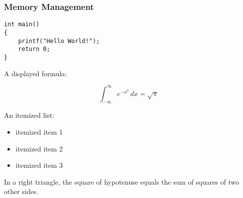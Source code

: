 \documentclass{beamer}
\begin{document}
\begin{frame}[fragile]
\frametitle{Memory Management}


\begin{lstlisting}[caption=First C example]
int main()
{
    printf("Hello World!");
    return 0;
}
\end{lstlisting}

A displayed formula:

\[
  \int_{-\infty}^\infty e^{-x^2} \, dx = \sqrt{\pi}
\]

An itemized list:

\begin{itemize}
  \item itemized item 1
  \item itemized item 2
  \item itemized item 3
\end{itemize}

\begin{theorem}
  In a right triangle, the square of hypotenuse equals
  the sum of squares of two other sides.
\end{theorem}

\end{frame}
\end{document}

